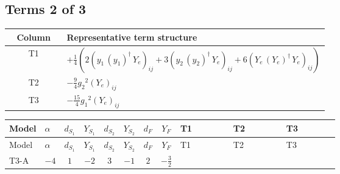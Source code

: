 \documentclass[8pt]{article}
\begin{document}
\begin{landscape}
\subsection*{Terms 2 of 3}
\begin{center}
\begin{tabular}{@{}c >{\raggedright\arraybackslash}p{0.82\linewidth}@{}}
\toprule
Column & Representative term structure \\
\midrule
T1 & \(\displaystyle +\frac{1}{4} (2 \left({y_1}\,\left({y_1}\right)^{\dagger}\,{Y_e}\right)_{ij}+3 \left({y_2}\,\left({y_2}\right)^{\dagger}\,{Y_e}\right)_{ij}+6 \left({Y_e}\,\left({Y_e}\right)^{\dagger}\,{Y_e}\right)_{ij})\) \\
\midrule
T2 & \(\displaystyle -\frac{9}{4} {g_2}^2 \left({Y_e}\right)_{ij}\) \\
\midrule
T3 & \(\displaystyle -\frac{15}{4} {g_1}^2 \left({Y_e}\right)_{ij}\) \\
\midrule
\bottomrule
\end{tabular}
\end{center}
\smallskip
\tiny
\begin{longtable}{@{}llcccccc >{\raggedright\arraybackslash}p{0.21\linewidth} >{\raggedright\arraybackslash}p{0.21\linewidth} >{\raggedright\arraybackslash}p{0.21\linewidth}@{}}
\toprule
Model & $\alpha$ & $d_{S_1}$ & $Y_{S_1}$ & $d_{S_2}$ & $Y_{S_2}$ & $d_F$ & $Y_F$ & T1 & T2 & T3 \\
\midrule
\endfirsthead
\toprule
Model & $\alpha$ & $d_{S_1}$ & $Y_{S_1}$ & $d_{S_2}$ & $Y_{S_2}$ & $d_F$ & $Y_F$ & T1 & T2 & T3 \\
\midrule
\endhead
T3-A & $-4$ & $1$ & $-2$ & $3$ & $-1$ & $2$ & $-\frac{3}{2}$ & \scriptsize\adjustbox{max width=\linewidth}{$\begin{gathered} +\frac{1}{4} (2 \left({y_1}\,\left({y_1}\right)^{\dagger}\,{Y_e}\right)_{ij}+3 \left({y_2}\,\left({y_2}\right)^{\dagger}\,{Y_e}\right)_{ij}+6 \left({Y_e}\,\left({Y_e}\right)^{\dagger}\,{Y_e}\right)_{ij})\end{gathered}$} & \scriptsize\adjustbox{max width=\linewidth}{$\begin{gathered} -\frac{9}{4} {g_2}^2 \left({Y_e}\right)_{ij}\end{gathered}$} & \scriptsize\adjustbox{max width=\linewidth}{$\begin{gathered} -\frac{15}{4} {g_1}^2 \left({Y_e}\right)_{ij}\end{gathered}$} \\
\midrule

\end{longtable}
\end{landscape}
\end{document}
